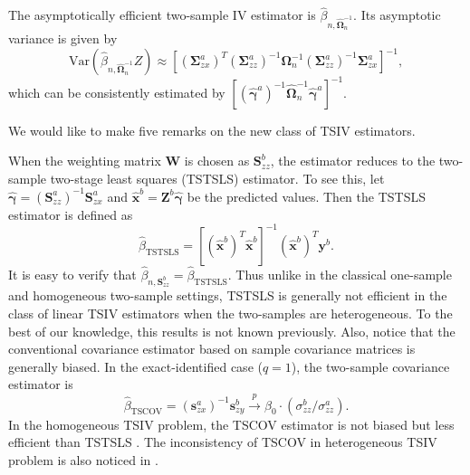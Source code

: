 \documentclass[preprint]{imsart}
\begin{document}

The asymptotically efficient two-sample IV estimator is
$\hat{\beta}_{n,\hat{\bm{\Omega}}_n^{-1}}$. Its asymptotic
variance is given by
\begin{equation} \label{eq:tsiv-var}
  \mathrm{Var}(\hat{\beta}_{n,\hat{\bm{\Omega}}_n^{-1}}Z) \approx
  [(\bm{\Sigma}^a_{zx})^T (\bm{\Sigma}^a_{zz})^{-1} \bm{\Omega}^{-1}_n
  (\bm{\Sigma}^a_{zz})^{-1} \bm{\Sigma}^a_{zx}]^{-1},
\end{equation}
which can be consistently estimated by $[(\hat{\bm{\gamma}}^a)^{-1}
\hat{\bm{\Omega}}_n^{-1} \hat{\bm{\gamma}}^a]^{-1}$.

We would like to make five remarks on the new class of TSIV estimators.

\begin{remark}
  When the weighting matrix $\bm{W}$ is chosen as $\mathbf{S}_{zz}^b$, the estimator reduces to the
  two-sample two-stage least squares (TSTSLS) estimator. To see this, let $\hat{\bm{\gamma}} = (\mathbf{S}^a_{zz})^{-1}
  \mathbf{S}^a_{zx}$ and $\hat{\mathbf{x}}^b = \mathbf{Z}^b
  \hat{\bm{\gamma}}$ be the predicted values. Then the TSTSLS estimator is
  defined as
  \[
  \hat{\beta}_{\text{TSTSLS}} = [(\hat{\mathbf{x}}^b)^T \hat{\mathbf{x}}^b]^{-1}
  (\hat{\mathbf{x}}^b)^T \mathbf{y}^b.
  \]
  It is easy to verify that $\hat{\beta}_{n,\mathbf{S}_{zz}^b} =
  \hat{\beta}_{\text{TSTSLS}}$. Thus unlike in the classical one-sample and
  homogeneous two-sample settings, TSTSLS is generally not efficient
  in the class of linear TSIV estimators when the two-samples are
  heterogeneous. To the best of our knowledge, this results is not
  known previously. Also, notice that the conventional covariance
  estimator based on sample covariance matrices is generally
  biased. In the exact-identified case ($q = 1$), the two-sample
  covariance estimator is
  \[
  \hat{\beta}_{\text{TSCOV}}= (\mathbf{s}^a_{zx})^{-1} \mathbf{s}^b_{zy}
  \overset{p}{\to} \beta_0 \cdot (\sigma^b_{zz} / \sigma^a_{zz}).
  \]
  In the homogeneous TSIV problem, the TSCOV estimator is not biased
  but less efficient than TSTSLS \citep{inoue2010two}. The
  inconsistency of TSCOV in heterogeneous TSIV problem is also noticed
  in \citet[footnote 1]{inoue2010two}.
\end{remark}
\end{document}
